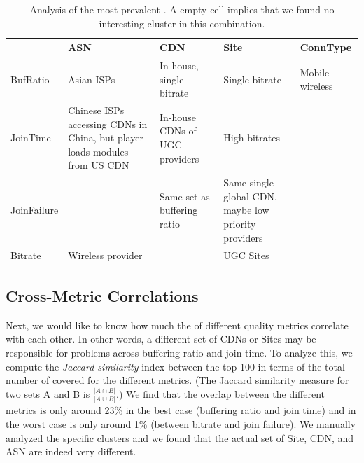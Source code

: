 \begin{table}[t]
\begin{center}
\begin{small}
\begin{tabular}{p{1.5cm}|p{3.5cm}|p{2.5cm}|p{3.5cm}|p{2.5cm}}
		& ASN &  CDN   & Site  & ConnType  \\ \hline 

BufRatio	 & Asian ISPs  & In-house, single bitrate   & Single bitrate &  Mobile wireless  \\   \hline
JoinTime 	&  Chinese ISPs accessing CDNs in China, but player loads modules from US CDN	& In-house CDNs of UGC providers & High bitrates  \\  \hline 
JoinFailure 	&   & Same set as buffering ratio & Same single global CDN, maybe low priority providers &  \\ \hline 
Bitrate 	& Wireless provider &   & UGC Sites &    
\end{tabular}
\end{small}
\end{center}
\caption{Analysis of the most  prevalent \criticalclusters. 
A empty cell implies that we found no interesting 
 cluster in this combination.}
\label{tab:depth}
\end{table}


\subsection{Cross-Metric Correlations} 
\label{subsec:measurement:video:correlation}

Next, we would like to know how much the \criticalclusters
of different quality metrics correlate with each other.
In other words, a different set of CDNs or Sites may 
be responsible for problems across buffering ratio and
join time. 
To analyze this, we compute the \emph{Jaccard similarity} 
index between the top-100 in terms of the total number 
of \problemsessions covered  \criticalclusters  
for the different metrics. 
(The Jaccard similarity measure for two sets A and B 
is $\frac{|A \cap B|}{|A \cup B|}$.)
We find that the overlap between the different 
metrics is only around 23\% in the best case (buffering 
ratio and join time) and in the worst case is only around
1\% (between bitrate and join failure).  
We manually analyzed the specific clusters and we 
found that  the actual set of Site, CDN, and ASN
\criticalclusters are indeed very different.  

